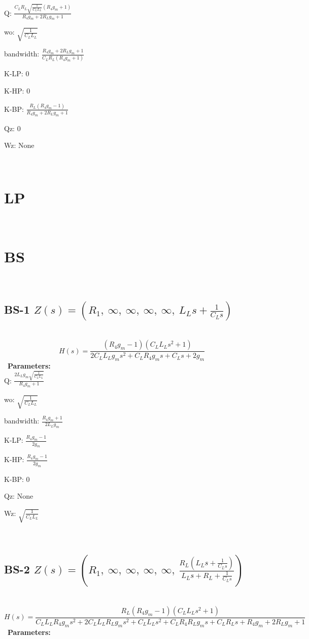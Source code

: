 \documentclass{article}
\begin{document}
Q: $\frac{C_{L} R_{L} \sqrt{\frac{1}{C_{L} L_{L}}} \left(R_{4} g_{m} + 1\right)}{R_{4} g_{m} + 2 R_{L} g_{m} + 1}$\ 

wo: $\sqrt{\frac{1}{C_{L} L_{L}}}$\ 

bandwidth: $\frac{R_{4} g_{m} + 2 R_{L} g_{m} + 1}{C_{L} R_{L} \left(R_{4} g_{m} + 1\right)}$\ 

K-LP: $0$\ 

K-HP: $0$\ 

K-BP: $\frac{R_{L} \left(R_{4} g_{m} - 1\right)}{R_{4} g_{m} + 2 R_{L} g_{m} + 1}$\ 

Qz: $0$\ 

Wz: $\text{None}$\ 

\ 

\section{LP}\ 
\section{BS}\ 
\subsection{BS-1 $Z(s) = \left( R_{1}, \  \infty, \  \infty, \  \infty, \  \infty, \  L_{L} s + \frac{1}{C_{L} s}\right)$ } \ 
\textbf{\[H(s) = \frac{\left(R_{4} g_{m} - 1\right) \left(C_{L} L_{L} s^{2} + 1\right)}{2 C_{L} L_{L} g_{m} s^{2} + C_{L} R_{4} g_{m} s + C_{L} s + 2 g_{m}}\] } \ 
\textbf{Parameters:}\\ 

Q: $\frac{2 L_{L} g_{m} \sqrt{\frac{1}{C_{L} L_{L}}}}{R_{4} g_{m} + 1}$\ 

wo: $\sqrt{\frac{1}{C_{L} L_{L}}}$\ 

bandwidth: $\frac{R_{4} g_{m} + 1}{2 L_{L} g_{m}}$\ 

K-LP: $\frac{R_{4} g_{m} - 1}{2 g_{m}}$\ 

K-HP: $\frac{R_{4} g_{m} - 1}{2 g_{m}}$\ 

K-BP: $0$\ 

Qz: $\text{None}$\ 

Wz: $\sqrt{\frac{1}{C_{L} L_{L}}}$\ 

\ 

\subsection{BS-2 $Z(s) = \left( R_{1}, \  \infty, \  \infty, \  \infty, \  \infty, \  \frac{R_{L} \left(L_{L} s + \frac{1}{C_{L} s}\right)}{L_{L} s + R_{L} + \frac{1}{C_{L} s}}\right)$ } \ 
\textbf{\[H(s) = \frac{R_{L} \left(R_{4} g_{m} - 1\right) \left(C_{L} L_{L} s^{2} + 1\right)}{C_{L} L_{L} R_{4} g_{m} s^{2} + 2 C_{L} L_{L} R_{L} g_{m} s^{2} + C_{L} L_{L} s^{2} + C_{L} R_{4} R_{L} g_{m} s + C_{L} R_{L} s + R_{4} g_{m} + 2 R_{L} g_{m} + 1}\] } \ 
\textbf{Parameters:}\\ 
\end{document}
